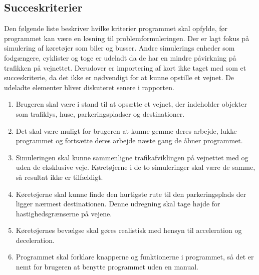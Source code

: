 \vspace{5mm}

\subsection{Succeskriterier}\label{Succeskriterier}
Den følgende liste beskriver hvilke kriterier programmet skal opfylde, før programmet kan være en løsning til problemformuleringen. Der er lagt fokus på simulering af køretøjer som biler og busser. Andre simulerings enheder som fodgængere, cyklister og toge er udeladt da de har en mindre påvirkning på trafikken på vejnettet. Derudover er importering af kort ikke taget med som et succeskriterie, da det ikke er nødvendigt for at kunne opstille et vejnet. De udeladte elementer bliver diskuteret senere i rapporten.

\begin{enumerate}
\item Brugeren skal være i stand til at opsætte et vejnet, der indeholder objekter som trafiklys, huse, parkeringspladser og destinationer.
\item Det skal være muligt for brugeren at kunne gemme deres arbejde, lukke programmet og fortsætte deres arbejde næste gang de åbner programmet.
\item Simuleringen skal kunne sammenligne trafikafviklingen på vejnettet med og uden de eksklusive veje. Køretøjerne i de to simuleringer skal være de samme, så resultat ikke er tilfældigt.
\item Køretøjerne skal kunne finde den hurtigste rute til den parkeringsplads der ligger nærmest destinationen. Denne udregning skal tage højde for hastighedsgrænserne på vejene.
\item Køretøjernes bevælgse skal gøres realistisk med hensyn til acceleration og deceleration.
\item Programmet skal forklare knapperne og funktionerne i programmet, så det er nemt for brugeren at benytte programmet uden en manual.
\end{enumerate}
